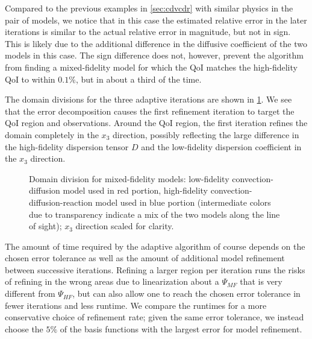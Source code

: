 %
Compared to the previous examples in \cref{sec:cdvcdr} with similar physics in the pair of models, we notice that in this case the estimated relative error in the later iterations is similar to the actual relative error in magnitude, but not in sign. This is likely due to the additional difference in the diffusive coefficient of the two models in this case. The sign difference does not, however, prevent the algorithm from finding a mixed-fidelity model for which the QoI matches the high-fidelity QoI to within $0.1\%$, but in about a third of the time. %

The domain divisions for the three adaptive iterations are shown in \cref{fig:divvy3D}. We see that the error decomposition causes the first refinement iteration to target the QoI region and observations. Around the QoI region, the first iteration refines the domain completely in the $x_3$ direction, possibly reflecting the large difference in the high-fidelity dispersion tensor $D$ and the low-fidelity dispersion coefficient in the $x_3$ direction.
%
\begin{figure}[htbp]
\centering
{}
\caption{Domain division for mixed-fidelity models: low-fidelity convection-diffusion model used in red portion, high-fidelity convection-diffusion-reaction model used in blue portion (intermediate colors due to transparency indicate a mix of the two models along the line of sight); $x_3$ direction scaled for clarity.}
\label{fig:divvy3D}
\end{figure} 
%

The amount of time required by the adaptive algorithm of course depends on the chosen error tolerance as well as the amount of additional model refinement between successive iterations. Refining a larger region per iteration runs the risks of refining in the wrong areas due to linearization about a $\Psi_{MF}$ that is very different from $\Psi_{HF}$, but can also allow one to reach the chosen error tolerance in fewer iterations and less runtime. We compare the runtimes for a more conservative choice of refinement rate; given the same error tolerance, we instead choose the $5\%$ of the basis functions with the largest error for model refinement. 

